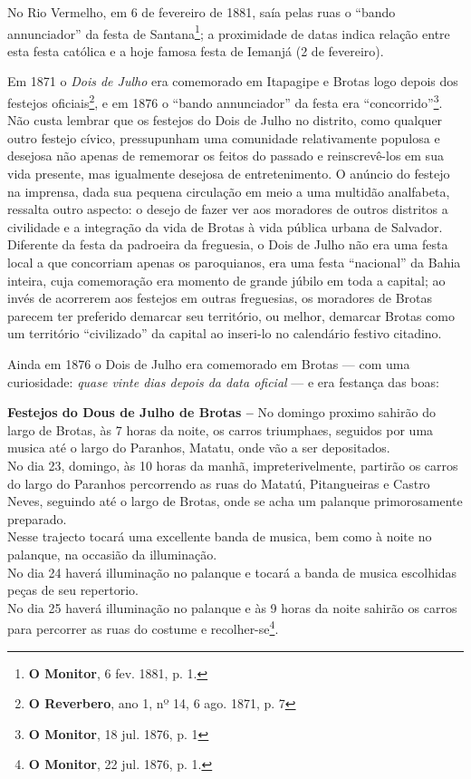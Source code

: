No Rio Vermelho, em 6 de fevereiro de 1881, saía pelas ruas o ``bando annunciador'' da festa de Santana\footnote{\textbf{O Monitor}, 6 fev. 1881, p. 1.}; a proximidade de datas indica relação entre esta festa católica e a hoje famosa festa de Iemanjá (2 de fevereiro).

Em 1871 o \textit{Dois de Julho} era comemorado em Itapagipe e Brotas logo depois dos festejos oficiais\footnote{\textbf{O Reverbero}, ano 1, nº 14, 6 ago. 1871, p. 7}, e em 1876 o ``bando annunciador'' da festa era ``concorrido''\footnote{\textbf{O Monitor}, 18 jul. 1876, p. 1}. Não custa lembrar que os festejos do Dois de Julho no distrito, como qualquer outro festejo cívico, pressupunham uma comunidade relativamente populosa e desejosa não apenas de rememorar os feitos do passado e reinscrevê-los em sua vida presente, mas igualmente desejosa de entretenimento. O anúncio do festejo na imprensa, dada sua pequena circulação em meio a uma multidão analfabeta, ressalta outro aspecto: o desejo de fazer ver aos moradores de outros distritos a civilidade e a integração da vida de Brotas à vida pública urbana de Salvador. Diferente da festa da padroeira da freguesia, o Dois de Julho não era uma festa local a que concorriam apenas os paroquianos, era uma festa ``nacional'' da Bahia inteira, cuja comemoração era momento de grande júbilo em toda a capital; ao invés de acorrerem aos festejos em outras freguesias, os moradores de Brotas parecem ter preferido demarcar seu território, ou melhor, demarcar Brotas como um território ``civilizado'' da capital ao inseri-lo no calendário festivo citadino.

Ainda em 1876 o Dois de Julho era comemorado em Brotas --- com uma curiosidade: \textit{quase vinte dias depois da data oficial} --- e era festança das boas:

\begin{citacao}
\textbf{Festejos do Dous de Julho de Brotas --} No domingo proximo sahirão do largo de Brotas, às 7 horas da noite, os carros triumphaes, seguidos por uma musica até o largo do Paranhos, Matatu, onde vão a ser depositados. \\
No dia 23, domingo, às 10 horas da manhã, impreterivelmente, partirão os carros do largo do Paranhos percorrendo as ruas do Matatú, Pitangueiras e Castro Neves, seguindo até o largo de Brotas, onde se acha um palanque primorosamente preparado. \\
Nesse trajecto tocará uma excellente banda de musica, bem como à noite no palanque, na occasião da illuminação. \\
No dia 24 haverá illuminação no palanque e tocará a banda de musica escolhidas peças de seu repertorio. \\
No dia 25 haverá illuminação no palanque e às 9 horas da noite sahirão os carros para percorrer as ruas do costume e recolher-se\footnote{\textbf{O Monitor}, 22 jul. 1876, p. 1.}.
\end{citacao}

